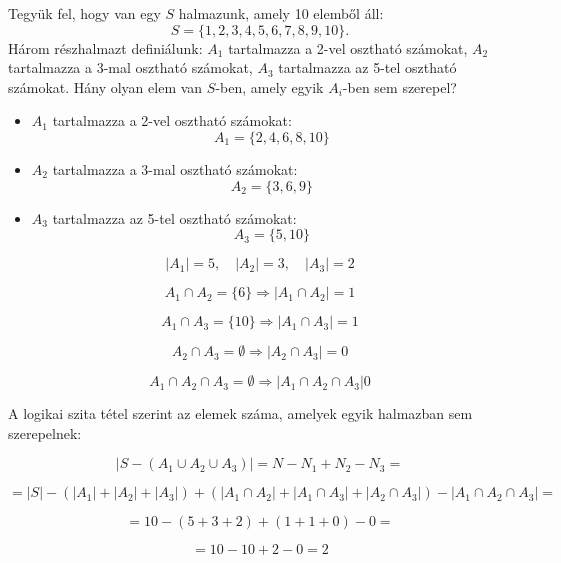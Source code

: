 \begin{problem}
Tegyük fel, hogy van egy $S$ halmazunk, amely 10 elemből áll: 
\[
S=\{1,2,3,4,5,6,7,8,9,10\}.
\]
Három részhalmazt definiálunk: $A_{1}$ tartalmazza a 2-vel osztható
számokat, $A_{2}$ tartalmazza a 3-mal osztható számokat, $A_{3}$
tartalmazza az 5-tel osztható számokat. Hány olyan elem van $S$-ben,
amely egyik $A_{i}$-ben sem szerepel? \vspace{5mm}
\end{problem}
\begin{solution} 
\begin{itemize}
\item $A_{1}$ tartalmazza a 2-vel osztható számokat: 
\[
A_{1}=\{2,4,6,8,10\}
\]
\item $A_{2}$ tartalmazza a 3-mal osztható számokat: 
\[
A_{2}=\{3,6,9\}
\]
\item $A_{3}$ tartalmazza az 5-tel osztható számokat: 
\[
A_{3}=\{5,10\}
\]
\end{itemize}
\[
|A_{1}|=5,\quad|A_{2}|=3,\quad|A_{3}|=2
\]

\[
A_{1}\cap A_{2}=\{6\}\Rightarrow|A_{1}\cap A_{2}|=1
\]

\[
A_{1}\cap A_{3}=\{10\}\Rightarrow|A_{1}\cap A_{3}|=1
\]

\[
A_{2}\cap A_{3}=\emptyset\Rightarrow|A_{2}\cap A_{3}|=0
\]

\[
A_{1}\cap A_{2}\cap A_{3}=\emptyset\Rightarrow|A_{1}\cap A_{2}\cap A_{3}|0
\]

A logikai szita tétel szerint az elemek száma, amelyek egyik halmazban
sem szerepelnek:

\[
|S-(A_{1}\cup A_{2}\cup A_{3})|=N-N_{1}+N_{2}-N_{3}=
\]

\[
=|S|-(|A_{1}|+|A_{2}|+|A_{3}|)+(|A_{1}\cap A_{2}|+|A_{1}\cap A_{3}|+|A_{2}\cap A_{3}|)-|A_{1}\cap A_{2}\cap A_{3}|=
\]

\[
=10-(5+3+2)+(1+1+0)-0=
\]

\[
=10-10+2-0=2
\]
\end{solution}

